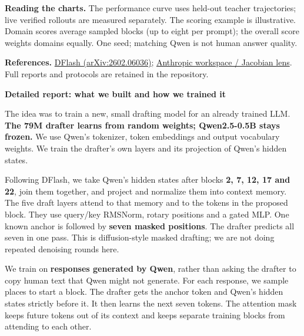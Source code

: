 \documentclass[11pt,a4paper]{article}
\begin{document}
{\footnotesize \textbf{Reading the charts.} The performance curve uses held-out teacher trajectories; live verified rollouts are measured separately. The scoring example is illustrative. Domain scores average sampled blocks (up to eight per prompt); the overall score weights domains equally. One seed; matching Qwen is not human answer quality.\par}
\vspace{1mm}
{\footnotesize \textbf{References.} \href{https://arxiv.org/abs/2602.06036}{DFlash (arXiv:2602.06036)}; \href{https://transformer-circuits.pub/2026/workspace/index.html}{Anthropic workspace / Jacobian lens}. Full reports and protocols are retained in the repository.\par}
\newpage\small

{\Large\bfseries Detailed report: what we built and how we trained it\par}\vspace{3mm}

\vspace{2mm}{\large\bfseries The drafter\par}

The idea was to train a new, small drafting model for an already trained LLM. \textbf{The 79M drafter learns from random weights; Qwen2.5-0.5B stays frozen.} We use Qwen's tokenizer, token embeddings and output vocabulary weights. We train the drafter's own layers and its projection of Qwen's hidden states.

Following DFlash, we take Qwen's hidden states after blocks \textbf{2, 7, 12, 17 and 22}, join them together, and project and normalize them into context memory. The five draft layers attend to that memory and to the tokens in the proposed block. They use query/key RMSNorm, rotary positions and a gated MLP. One known anchor is followed by \textbf{seven masked positions}. The drafter predicts all seven in one pass. This is diffusion-style masked drafting; we are not doing repeated denoising rounds here.

\vspace{2mm}{\large\bfseries The training data\par}

We train on \textbf{responses generated by Qwen}, rather than asking the drafter to copy human text that Qwen might not generate. For each response, we sample places to start a block. The drafter gets the anchor token and Qwen's hidden states strictly before it. It then learns the next seven tokens. The attention mask keeps future tokens out of its context and keeps separate training blocks from attending to each other.
\end{document}
